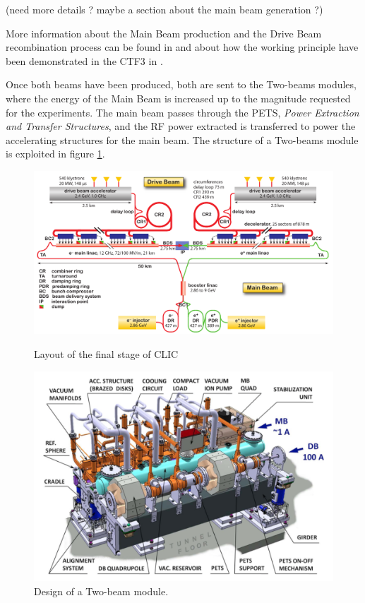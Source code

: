 \vspace{5mm}
(need more details ? maybe a section about the main beam generation ?)
\vspace{5mm}


More information about the Main Beam production and the Drive Beam recombination process can be found in \cite{CLIC:cdr} and about how the working principle have been demonstrated in the CTF3 in \cite{CTF:drive_beam}. 

Once both beams have been produced, both are sent to the Two-beams modules, where the energy of the Main Beam is increased up to the magnitude requested for the experiments. The main beam passes through the PETS, \textit{Power Extraction and Transfer Structures}, and the RF power extracted is transferred to power the accelerating structures for the main beam. The structure of a Two-beams module is exploited in figure \ref{TBM}.



\begin{figure}
\centering

\includegraphics[scale=0.39]{pictures/CLIC_layout_3Tev}
\caption{Layout of the final stage of CLIC}
\label{CLIC_layout}

\hspace{8mm}

\includegraphics[scale=0.39]{pictures/TBM}
\caption{Design of a Two-beam module. }
\label{TBM}

\end{figure}





